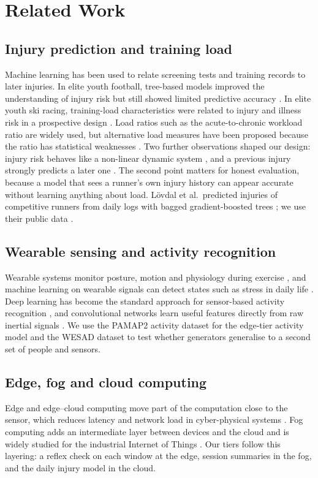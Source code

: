 \documentclass[12pt,a4paper]{article}
\begin{document}
\section{Related Work}\label{sec:related}
\subsection{Injury prediction and training load}
Machine learning has been used to relate screening tests and training records to later injuries.
In elite youth football, tree-based models improved the understanding of injury risk but still
showed limited predictive accuracy \citep{oliver2020}. In elite youth ski racing, training-load
characteristics were related to injury and illness risk in a prospective design
\citep{hildebrandt2021}. Load ratios such as the acute-to-chronic workload ratio are widely
used, but alternative load measures have been proposed because the ratio has statistical
weaknesses \citep{tysoe2020}. Two further observations shaped our design: injury risk behaves
like a non-linear dynamic system \citep{stern2020}, and a previous injury strongly predicts a
later one \citep{stern2021}. The second point matters for honest evaluation, because a model
that sees a runner's own injury history can appear accurate without learning anything about
load. L\"ovdal et al.\ predicted injuries of competitive runners from daily logs with bagged
gradient-boosted trees \citep{lovdal2021}; we use their public data \citep{lovdal2021data}.

\subsection{Wearable sensing and activity recognition}
Wearable systems monitor posture, motion and physiology during exercise
\citep{caviedes2020}, and machine learning on wearable signals can detect states such as stress
in daily life \citep{abdalalim2024}. Deep learning has become the standard approach for
sensor-based activity recognition \citep{wang2019}, and convolutional networks learn useful
features directly from raw inertial signals \citep{ronao2016}. We use the PAMAP2 activity dataset
\citep{reiss2012} for the edge-tier activity model and the WESAD dataset \citep{schmidt2018} to
test whether generators generalise to a second set of people and sensors.

\subsection{Edge, fog and cloud computing}
Edge and edge--cloud computing move part of the computation close to the sensor, which reduces
latency and network load in cyber-physical systems \citep{cao2021}. Fog computing adds an
intermediate layer between devices and the cloud and is widely studied for the industrial
Internet of Things \citep{aazam2018}. Our tiers follow this layering: a reflex check on each
window at the edge, session summaries in the fog, and the daily injury model in the cloud.
\end{document}
